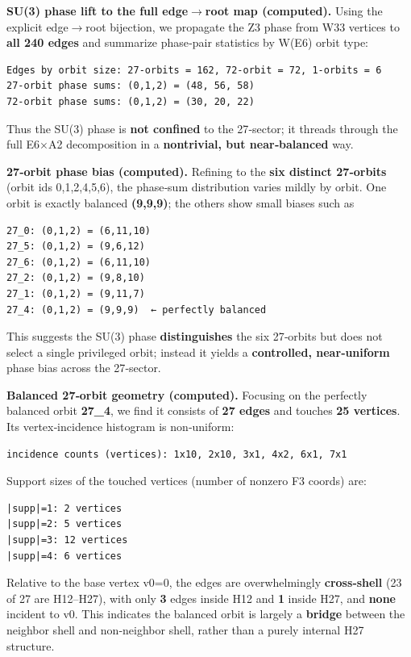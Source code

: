 \documentclass[11pt]{article}
\newcounter{none}
\begin{document}
\textbf{SU(3) phase lift to the full edge\ensuremath{\rightarrow}root
map (computed).} Using the explicit edge\ensuremath{\rightarrow}root
bijection, we propagate the Z3 phase from W33 vertices to \textbf{all
240 edges} and summarize phase‑pair statistics by W(E6) orbit type:

\begin{verbatim}
Edges by orbit size: 27‑orbits = 162, 72‑orbit = 72, 1‑orbits = 6
27‑orbit phase sums: (0,1,2) = (48, 56, 58)
72‑orbit phase sums: (0,1,2) = (30, 20, 22)
\end{verbatim}

Thus the SU(3) phase is \textbf{not confined} to the 27‑sector; it
threads through the full E6\ensuremath{\times}A2 decomposition in a
\textbf{nontrivial, but near‑balanced} way.

\textbf{27‑orbit phase bias (computed).} Refining to the \textbf{six
distinct 27‑orbits} (orbit ids 0,1,2,4,5,6), the phase‑sum distribution
varies mildly by orbit. One orbit is exactly balanced \textbf{(9,9,9)};
the others show small biases such as

\begin{verbatim}
27_0: (0,1,2) = (6,11,10)
27_5: (0,1,2) = (9,6,12)
27_6: (0,1,2) = (6,11,10)
27_2: (0,1,2) = (9,8,10)
27_1: (0,1,2) = (9,11,7)
27_4: (0,1,2) = (9,9,9)  ← perfectly balanced
\end{verbatim}

This suggests the SU(3) phase \textbf{distinguishes} the six 27‑orbits
but does not select a single privileged orbit; instead it yields a
\textbf{controlled, near‑uniform} phase bias across the 27‑sector.

\textbf{Balanced 27‑orbit geometry (computed).} Focusing on the
perfectly balanced orbit \textbf{27\_4}, we find it consists of
\textbf{27 edges} and touches \textbf{25 vertices}. Its vertex‑incidence
histogram is non‑uniform:

\begin{verbatim}
incidence counts (vertices): 1x10, 2x10, 3x1, 4x2, 6x1, 7x1
\end{verbatim}

Support sizes of the touched vertices (number of nonzero F3 coords) are:

\begin{verbatim}
|supp|=1: 2 vertices
|supp|=2: 5 vertices
|supp|=3: 12 vertices
|supp|=4: 6 vertices
\end{verbatim}

Relative to the base vertex v0=0, the edges are overwhelmingly
\textbf{cross‑shell} (23 of 27 are H12--H27), with only \textbf{3} edges
inside H12 and \textbf{1} inside H27, and \textbf{none} incident to v0.
This indicates the balanced orbit is largely a \textbf{bridge} between
the neighbor shell and non‑neighbor shell, rather than a purely internal
H27 structure.
\end{document}
